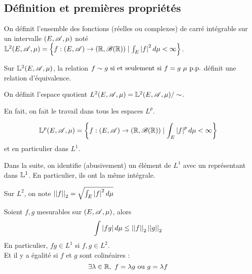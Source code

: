 \subsection{Définition et premières propriétés}

\begin{definition}
	On définit l'ensemble des fonctions (réelles ou complexes) de carré intégrable sur un intervalle $(E, \mathscr{A}, \mu)$ noté
	$\mathbb{L}^2 (E, \mathscr{A}, \mu) = \left\{ f: (E, \mathscr{A}) \to (\mathbb{R}, \mathscr{B}(\mathbb{R})) \mid \int_E \left|f\right|^2 d \mu < \infty \right\}$.
\end{definition}


\begin{prop}
	Sur $\mathbb{L}^2 (E, \mathscr{A}, \mu)$, la relation $f \sim g \text{ si et seulement si } f = g \ \mu \text{ p.p.}$ définit une relation d'équivalence.
\end{prop}

\begin{definition}
	On définit l'espace quotient $L^2(E, \mathscr{A}, \mu) = \mathbb{L}^2 (E, \mathscr{A}, \mu) / \sim$.
\end{definition}

\begin{remarque}
	En fait, on fait le travail dans tous les espaces $L^p$.

	$$ \mathbb{L}^p (E, \mathscr{A}, \mu) = \left\{ f: (E, \mathscr{A}) \to (\mathbb{R}, \mathscr{B}(\mathbb{R})) \mid \int_E \left|f\right|^p d \mu < \infty \right\}$$
	et en particulier dans $L^1$.
\end{remarque}

\begin{remarque}
	Dans la suite, on identifie (abusivement) un élément de $L^1$ avec un représentant dans $\mathbb{L}^1$.
	En particulier, ils ont la même intégrale.

	Sur $L^2$, on note $\left|\left|f\right|\right|_2 = \sqrt{\int_E \left|f\right|^2 d \mu}$
\end{remarque}


\begin{theorem}
	Soient $f, g$ mesurables sur $(E, \mathscr{A}, \mu)$, alors
	$$\int \left|fg\right| d \mu \leq \left|\left|f\right|\right|_2 \left|\left|g\right|\right|_2$$
	En particulier, $fg \in L^1$ si $f, g \in L^2$.\\
	Et il y a égalité si  $f$ et $g$ sont colinéaires :
	$$\exists \lambda \in \mathbb{R}, \ f = \lambda g \text{ ou } g = \lambda f$$
\end{theorem}

